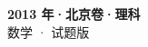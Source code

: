 \documentclass[zihao=-4, a4paper]{ctexart}
\begin{document}
\begin{center}
  {\Large\bfseries 2013 年·北京卷·理科}\\[4pt]
  {\large 数学 · 试题版}
\end{center}
\medskip
{}

\end{document}

